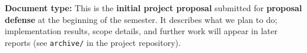 \noindent\textbf{Document type:} This is the \textbf{initial project proposal} submitted for
\textbf{proposal defense} at the beginning of the semester. It describes what we plan to do;
implementation results, scope details, and further work will appear in later reports
(see \texttt{archive/} in the project repository).
